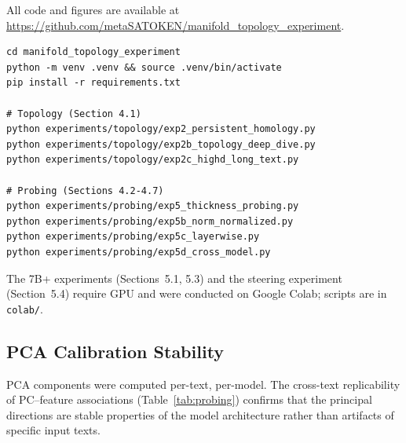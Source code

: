\documentclass[11pt,a4paper]{article}
\begin{document}
All code and figures are available at \url{https://github.com/metaSATOKEN/manifold_topology_experiment}.

\begin{verbatim}
cd manifold_topology_experiment
python -m venv .venv && source .venv/bin/activate
pip install -r requirements.txt

# Topology (Section 4.1)
python experiments/topology/exp2_persistent_homology.py
python experiments/topology/exp2b_topology_deep_dive.py
python experiments/topology/exp2c_highd_long_text.py

# Probing (Sections 4.2-4.7)
python experiments/probing/exp5_thickness_probing.py
python experiments/probing/exp5b_norm_normalized.py
python experiments/probing/exp5c_layerwise.py
python experiments/probing/exp5d_cross_model.py
\end{verbatim}

The 7B+ experiments (Sections~5.1, 5.3) and the steering experiment (Section~5.4) require GPU and were conducted on Google Colab; scripts are in \texttt{colab/}.

\subsection{PCA Calibration Stability}

PCA components were computed per-text, per-model. The cross-text replicability of PC--feature associations (Table~\ref{tab:probing}) confirms that the principal directions are stable properties of the model architecture rather than artifacts of specific input texts.
\end{document}
